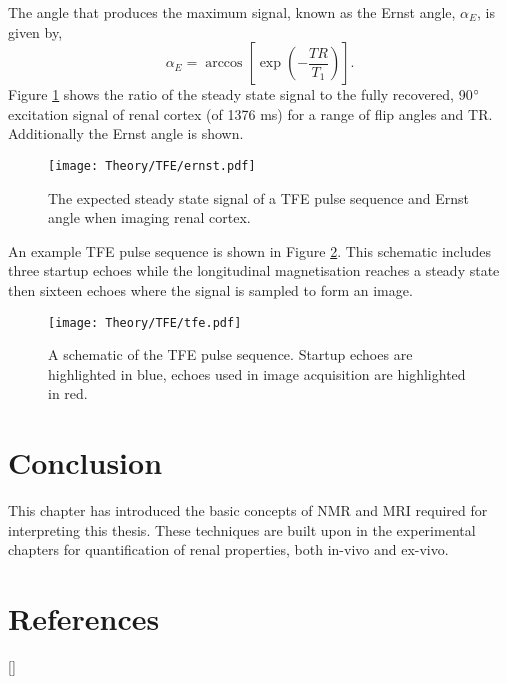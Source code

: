 The angle that produces the maximum signal, known as the Ernst angle, $\alpha_E$, is given by,
\begin{equation}
	\alpha_E = \arccos \left[ \exp \left( -\frac{TR}{T_1}\right)\right].
	\label{eq:theory_ernst}
\end{equation}
Figure \ref{fig:theory_ernst} shows the ratio of the steady state signal to the fully recovered, 90$\degree${ } excitation signal of renal cortex (\tone of 1376 ms) for a range of flip angles and \ac{TR}. Additionally the Ernst angle is shown. 
\begin{figure}[H]
	\centering
	\texttt{[image: Theory/TFE/ernst.pdf]}
	\caption{The expected steady state signal of a \ac{TFE} pulse sequence and Ernst angle when imaging renal cortex.}
	\label{fig:theory_ernst}	
\end{figure}

An example \ac{TFE} pulse sequence is shown in Figure \ref{fig:theory_tfe_psd}. This schematic includes three startup echoes while the longitudinal magnetisation reaches a steady state then sixteen echoes where the signal is sampled to form an image.

\begin{figure}[H]
	\centering
	\texttt{[image: Theory/TFE/tfe.pdf]}
	\caption{A schematic of the \ac{TFE} pulse sequence. Startup echoes are highlighted in blue, echoes used in image acquisition are highlighted in red.}
	\label{fig:theory_tfe_psd}
\end{figure}

\section{Conclusion}
This chapter has introduced the basic concepts of \ac{NMR} and \ac{MRI} required for interpreting this thesis. These techniques are built upon in the experimental chapters for quantification of renal properties, both in-vivo and ex-vivo.

\newpage
\section{References}
[\refname]{}
\printbibliography
